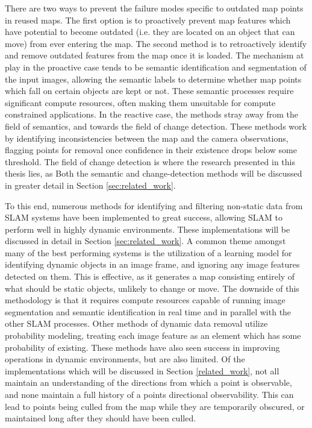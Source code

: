 There are two ways to prevent the failure modes specific to outdated map points in reused maps. The first option is to proactively prevent map features which have potential to become outdated (i.e. they are located on an object that can move) from ever entering the map. The second method is to retroactively identify and remove outdated features from the map once it is loaded. The mechanism at play in the proactive case tends to be semantic identification and segmentation of the input images, allowing the semantic labels to determine whether map points which fall on certain objects are kept or not. These semantic processes require significant compute resources, often making them unsuitable for compute constrained applications. In the reactive case, the methods stray away from the field of semantics, and towards the field of change detection. These methods work by identifying inconsistencies between the map and the camera observations, flagging points for removal once confidence in their existence drops below some threshold. The field of change detection is where the research presented in this thesis lies, as Both the semantic and change-detection methods will be discussed in greater detail in Section \ref{sec:related_work}.

To this end, numerous methods for identifying and filtering non-static data from SLAM systems have been implemented to great success, allowing SLAM to perform well in highly dynamic environments. These implementations will be discussed in detail in Section \ref{sec:related_work}. A common theme amongst many of the best performing systems is the utilization of a learning model for identifying dynamic objects in an image frame, and ignoring any image features detected on them. This is effective, as it generates a map consisting entirely of what should be static objects, unlikely to change or move. The downside of this methodology is that it requires compute resources capable of running image segmentation and semantic identification in real time and in parallel with the other SLAM processes. Other methods of dynamic data removal utilize probability modeling, treating each image feature as an element which has some probability of existing. These methods have also seen success in improving operations in dynamic environments, but are also limited. Of the implementations which will be discussed in Section \ref{related_work}, not all maintain an understanding of the directions from which a point is observable, and none maintain a full history of a points directional observability. This can lead to points being culled from the map while they are temporarily obscured, or maintained long after they should have been culled.

